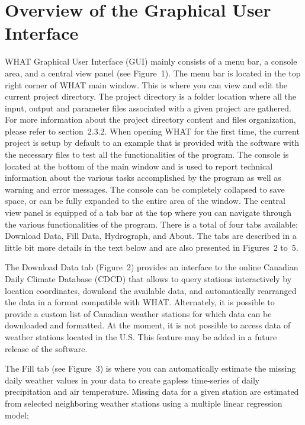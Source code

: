 \documentclass[12pt, letterpaper, fleqn]{report}
\begin{document}
\section{Overview of the Graphical User Interface}

WHAT Graphical User Interface (GUI) mainly consists of a menu bar, a console area, and a central view panel (see Figure 1). The menu bar is located in the top right corner of WHAT main window. This is where you can view and edit the current project directory. The project directory is a folder location where all the input, output and parameter files associated with a given project are gathered. For more information about the project directory content and files organization, please refer to section 2.3.2. When opening WHAT for the first time, the current project is setup by default to an example that is provided with the software with the necessary files to test all the functionalities of the program. The console is located at the bottom of the main window and is used to report technical information about the various tasks accomplished by the program as well as warning and error messages. The console can be completely collapsed to save space, or can be fully expanded to the entire area of the window. The central view panel is equipped of a tab bar at the top where you can navigate through the various functionalities of the program. There is a total of four tabs available: Download Data, Fill Data, Hydrograph, and About. The tabs are described in a little bit more details in the text below and are also presented in Figures 2 to 5.

The Download Data tab (Figure 2) provides an interface to the online Canadian Daily Climate Database (CDCD) that allows to query stations interactively by location coordinates, download the available data, and automatically rearranged the data in a format compatible with WHAT. Alternately, it is possible to provide a custom list of Canadian weather stations for which data can be downloaded and formatted. At the moment, it is not possible to access data of weather stations located in the U.S. This feature may be added in a future release of the software.

The Fill tab (see Figure 3) is where you can automatically estimate the missing daily weather values in your data to create gapless time-series of daily precipitation and air temperature. Missing data for a given station are estimated from selected neighboring weather stations using a multiple linear regression model;
\end{document}

